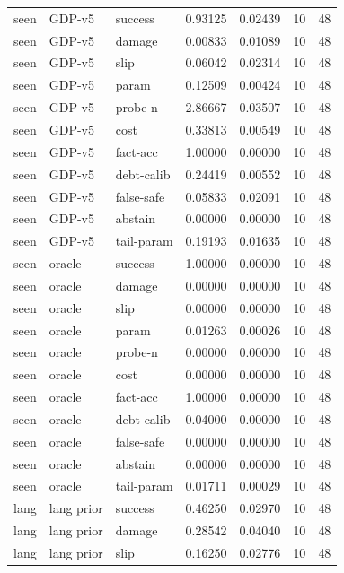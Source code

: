 \documentclass{article}
\begin{document}
\begin{center}
\begin{longtable}{lllllll}
seen & GDP-v5 & success & 0.93125 & 0.02439 & 10 & 48 \\
seen & GDP-v5 & damage & 0.00833 & 0.01089 & 10 & 48 \\
seen & GDP-v5 & slip & 0.06042 & 0.02314 & 10 & 48 \\
seen & GDP-v5 & param & 0.12509 & 0.00424 & 10 & 48 \\
seen & GDP-v5 & probe-n & 2.86667 & 0.03507 & 10 & 48 \\
seen & GDP-v5 & cost & 0.33813 & 0.00549 & 10 & 48 \\
seen & GDP-v5 & fact-acc & 1.00000 & 0.00000 & 10 & 48 \\
seen & GDP-v5 & debt-calib & 0.24419 & 0.00552 & 10 & 48 \\
seen & GDP-v5 & false-safe & 0.05833 & 0.02091 & 10 & 48 \\
seen & GDP-v5 & abstain & 0.00000 & 0.00000 & 10 & 48 \\
seen & GDP-v5 & tail-param & 0.19193 & 0.01635 & 10 & 48 \\
seen & oracle & success & 1.00000 & 0.00000 & 10 & 48 \\
seen & oracle & damage & 0.00000 & 0.00000 & 10 & 48 \\
seen & oracle & slip & 0.00000 & 0.00000 & 10 & 48 \\
seen & oracle & param & 0.01263 & 0.00026 & 10 & 48 \\
seen & oracle & probe-n & 0.00000 & 0.00000 & 10 & 48 \\
seen & oracle & cost & 0.00000 & 0.00000 & 10 & 48 \\
seen & oracle & fact-acc & 1.00000 & 0.00000 & 10 & 48 \\
seen & oracle & debt-calib & 0.04000 & 0.00000 & 10 & 48 \\
seen & oracle & false-safe & 0.00000 & 0.00000 & 10 & 48 \\
seen & oracle & abstain & 0.00000 & 0.00000 & 10 & 48 \\
seen & oracle & tail-param & 0.01711 & 0.00029 & 10 & 48 \\
lang & lang prior & success & 0.46250 & 0.02970 & 10 & 48 \\
lang & lang prior & damage & 0.28542 & 0.04040 & 10 & 48 \\
lang & lang prior & slip & 0.16250 & 0.02776 & 10 & 48 \\
\bottomrule
\end{longtable}
\renewcommand{\arraystretch}{1.0}
\end{center}
\end{document}
